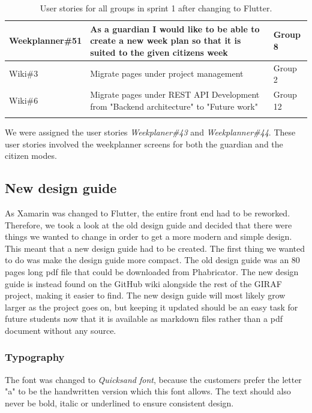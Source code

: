 \begin{longtable}{|p{2.8cm}|p{8cm}|p{1.6cm}|}
    Weekplanner\#51 & As a guardian I would like to be able to create a new week plan so that it is suited to the given citizens week & Group 8             \\ \hline
    Wiki\#3         & Migrate pages under project management                                                                                                                                   & Group 2              \\ \hline
    Wiki\#6         & Migrate pages under REST API Development from "Backend architecture" to "Future work"                                                                                    & Group 12             \\ \hline
    \caption{User stories for all groups in sprint 1 after changing to Flutter.}\label{table:user-stories-sprint-1}
\end{longtable}
\noindent
We were assigned the user stories \textit{Weekplaner\#43} and \textit{Weekplanner\#44}.
These user stories involved the weekplanner screens for both the guardian and the citizen modes.

\subsection{New design guide}
As Xamarin was changed to Flutter, the entire front end had to be reworked. 
Therefore, we took a look at the old design guide and decided that there were things we wanted to change in order to get a more modern and simple design.
This meant that a new design guide had to be created.
The first thing we wanted to do was make the design guide more compact.
The old design guide was an 80 pages long pdf file that could be downloaded from Phabricator.
The new design guide is instead found on the GitHub wiki alongside the rest of the GIRAF project, making it easier to find.
The new design guide will most likely grow larger as the project goes on, but keeping it updated should be an easy task for future students now that it is available as markdown files rather than a pdf document without any source. 

\subsubsection{Typography}
The font was changed to \textit{Quicksand font}, because the customers prefer the letter "a" to be the handwritten version which this font allows.
The text should also never be bold, italic or underlined to ensure consistent design.

